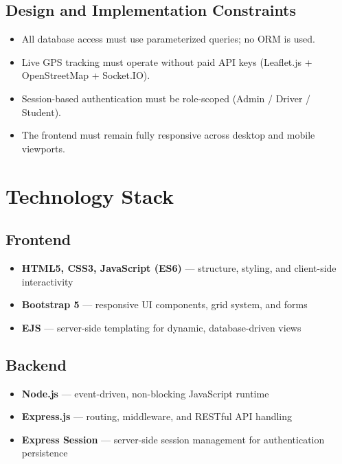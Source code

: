 \documentclass[11pt,a4paper]{report}
\begin{document}
\section{Design and Implementation Constraints}
\begin{itemize}[leftmargin=1.3em]
  \item All database access must use parameterized queries; no ORM is used.
  \item Live GPS tracking must operate without paid API keys (Leaflet.js + OpenStreetMap + Socket.IO).
  \item Session-based authentication must be role-scoped (Admin / Driver / Student).
  \item The frontend must remain fully responsive across desktop and mobile viewports.
\end{itemize}

\chapter{Technology Stack}

\section{Frontend}
\begin{itemize}[leftmargin=1.3em]
  \item \textbf{HTML5, CSS3, JavaScript (ES6)} --- structure, styling, and client-side interactivity
  \item \textbf{Bootstrap 5} --- responsive UI components, grid system, and forms
  \item \textbf{EJS} --- server-side templating for dynamic, database-driven views
\end{itemize}

\section{Backend}
\begin{itemize}[leftmargin=1.3em]
  \item \textbf{Node.js} --- event-driven, non-blocking JavaScript runtime
  \item \textbf{Express.js} --- routing, middleware, and RESTful API handling
  \item \textbf{Express Session} --- server-side session management for authentication persistence
\end{itemize}
\end{document}
